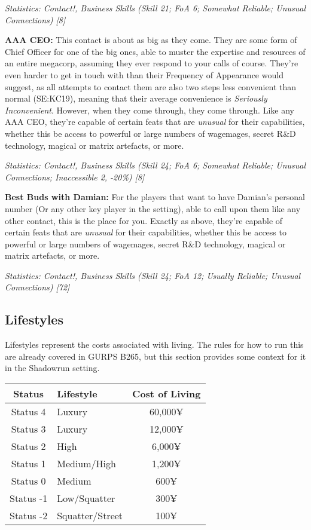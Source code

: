 \begin{multicols*}{2}
	\textit{\textcolor{OliveGreen}{Statistics: Contact!, Business Skills (Skill 21; FoA 6; Somewhat Reliable; Unusual Connections) [8]}}
	
	\textbf{AAA CEO:} This contact is about as big as they come. They are some form of Chief Officer for one of the big ones, able to muster the expertise and resources of an entire megacorp, assuming they ever respond to your calls of course. They're even harder to get in touch with than their Frequency of Appearance would suggest, as all attempts to contact them are also two steps less convenient than normal (SE:KC19), meaning that their average convenience is \textit{Seriously Inconvenient}. However, when they come through, they come through. Like any AAA CEO, they're capable of certain feats that are \textit{unusual} for their capabilities, whether this be access to powerful or large numbers of wagemages, secret R\&D technology, magical or matrix artefacts, or more.
	
	\textit{\textcolor{OliveGreen}{Statistics: Contact!, Business Skills (Skill 24; FoA 6; Somewhat Reliable; Unusual Connections; Inaccessible 2, -20\%) [8]}}
	
	\textbf{Best Buds with Damian:} For the players that want to have Damian's personal number (Or any other key player in the setting), able to call upon them like any other contact, this is the place for you. Exactly as above, they're capable of certain feats that are \textit{unusual} for their capabilities, whether this be access to powerful or large numbers of wagemages, secret R\&D technology, magical or matrix artefacts, or more.
	
	\textit{\textcolor{OliveGreen}{Statistics: Contact!, Business Skills (Skill 24; FoA 12; Usually Reliable; Unusual Connections) [72]}}
	
	\subsection{Lifestyles}
	
	Lifestyles represent the costs associated with living. The rules for how to run this are already covered in GURPS B265, but this section provides some context for it in the Shadowrun setting.
	
	\begin{center}
		\begin{tabularx}{0.49\textwidth}{|c|X|c|}
			\hline
			Status & Lifestyle & Cost of Living \\
			\hline
			\hline
			Status 4 & Luxury & 60,000¥ \\
			Status 3 & Luxury & 12,000¥ \\
			Status 2 & High & 6,000¥ \\
			Status 1 & Medium/High & 1,200¥ \\
			Status 0 & Medium & 600¥ \\
			Status -1 & Low/Squatter & 300¥ \\
			Status -2 & Squatter/Street & 100¥ \\
			\hline
		\end{tabularx}
	\end{center}
	

\end{multicols*}
